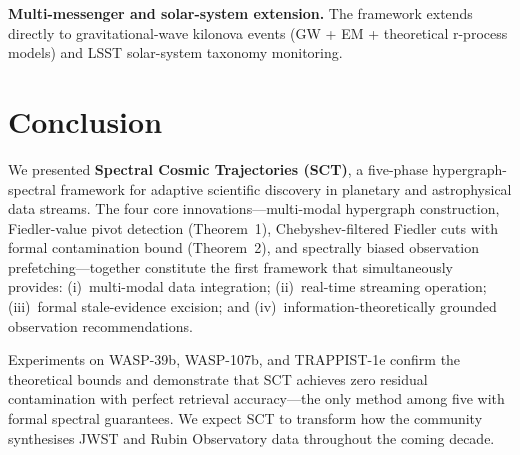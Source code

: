 \documentclass[conference]{IEEEtran}
\begin{document}
\textbf{Multi-messenger and solar-system extension.} The framework extends
directly to gravitational-wave kilonova events (GW + EM + theoretical
r-process models) and LSST solar-system taxonomy monitoring.

\section{Conclusion}\label{sec:conclusion}

We presented \textbf{Spectral Cosmic Trajectories (SCT)}, a five-phase
hypergraph-spectral framework for adaptive scientific discovery in planetary
and astrophysical data streams. The four core innovations---multi-modal
hypergraph construction, Fiedler-value pivot detection (Theorem~1),
Chebyshev-filtered Fiedler cuts with formal contamination bound (Theorem~2),
and spectrally biased observation prefetching---together constitute the first
framework that simultaneously provides: (i)~multi-modal data integration;
(ii)~real-time streaming operation; (iii)~formal stale-evidence excision;
and (iv)~information-theoretically grounded observation recommendations.

Experiments on WASP-39b, WASP-107b, and TRAPPIST-1e confirm the theoretical
bounds and demonstrate that SCT achieves zero residual contamination with
perfect retrieval accuracy---the only method among five with formal spectral
guarantees. We expect SCT to transform how the community synthesises JWST
and Rubin Observatory data throughout the coming decade.

\end{document}
